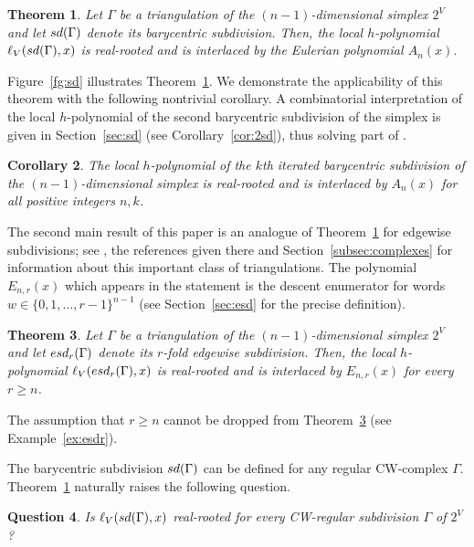 \documentclass[11pt]{amsart}
\newtheorem{theorem}{Theorem}[section]
\newtheorem{corollary}[theorem]{Corollary}
\newtheorem{question}[theorem]{Question}
\newcommand{\esd}{{\rm esd}}
\newcommand{\sd}{{\rm sd}}
\begin{document}
\begin{theorem} \label{thm:sd} 
Let $\Gamma$ be a triangulation of the 
$(n-1)$-dimensional simplex $2^V$ and let 
$\sd(\Gamma)$ denote its barycentric subdivision. 
Then, the local $h$-polynomial $\ell_V(\sd(\Gamma),x)$ 
is real-rooted and is interlaced by the Eulerian 
polynomial $A_n(x)$. 
\end{theorem}

Figure~\ref{fg:sd} illustrates Theorem~\ref{thm:sd}. 
We demonstrate the applicability of this theorem with 
the following nontrivial corollary. A combinatorial 
interpretation of the local $h$-polynomial of the 
second barycentric subdivision of the simplex is 
given in Section~\ref{sec:sd} (see 
Corollary~\ref{cor:2sd}), thus solving part of 
\cite[Problem~4.12]{Ath16a}.
%
\begin{corollary} \label{cor:sd} 
The local $h$-polynomial of the $k$th iterated 
barycentric subdivision of the $(n-1)$-dimensional 
simplex is real-rooted and is interlaced by 
$A_n(x)$ for all positive integers $n, k$. 
\end{corollary}

The second main result of this paper is an analogue
of Theorem~\ref{thm:sd} for edgewise subdivisions; 
see \cite{Ath16b} \cite[Section~3.2]{MW17}, the 
references given there and 
Section~\ref{subsec:complexes} for information 
about this important class of triangulations. The 
polynomial $E_{n,r}(x)$ which appears in the 
statement is the descent enumerator for words $w 
\in \{0, 1,\dots,r-1\}^{n-1}$ (see 
Section~\ref{sec:esd} for the precise definition).
%
\begin{theorem} \label{thm:esd} 
Let $\Gamma$ be a triangulation of the 
$(n-1)$-dimensional simplex $2^V$ and let 
$\esd_r(\Gamma)$ denote its $r$-fold edgewise 
subdivision. Then, the local $h$-polynomial 
$\ell_V(\esd_r(\Gamma),x)$ is real-rooted and is 
interlaced by $E_{n,r}(x)$ for every $r \ge n$. 
\end{theorem}

The assumption that $r \ge n$ cannot be dropped 
from Theorem~\ref{thm:esd} (see 
Example~\ref{ex:esdr}).

The barycentric subdivision $\sd(\Gamma)$ can be 
defined for any regular CW-complex $\Gamma$. 
Theorem~\ref{thm:sd} naturally raises the following
question. 
%
\begin{question} \label{que:CW} 
Is $\ell_V(\sd(\Gamma),x)$ real-rooted for every 
CW-regular subdivision $\Gamma$ of $2^V$?
\end{question}
\end{document}

